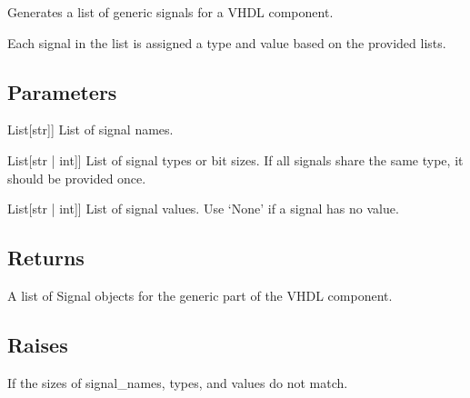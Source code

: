 \documentclass[letterpaper,10pt,english]{sphinxmanual}
\begin{document}

\begin{fulllineitems}
\label{\detokenize{functions:functions.generic_signals_list}}
\pysigstartsignatures
{}
\pysigstopsignatures
\sphinxAtStartPar
Generates a list of generic signals for a VHDL component.

\sphinxAtStartPar
Each signal in the list is assigned a type and value based on the provided lists.


\subsection{Parameters}
\label{\detokenize{functions:id1}}\begin{description}
\sphinxlineitem{signal\_names}{[}List{[}str{]}{]}
\sphinxAtStartPar
List of signal names.

\sphinxlineitem{types}{[}List{[}str | int{]}{]}
\sphinxAtStartPar
List of signal types or bit sizes. If all signals share the same type, it should be provided once.

\sphinxlineitem{values}{[}List{[}str | int{]}{]}
\sphinxAtStartPar
List of signal values. Use ‘None’ if a signal has no value.

\end{description}


\subsection{Returns}
\label{\detokenize{functions:id2}}\begin{description}
\sphinxAtStartPar
A list of Signal objects for the generic part of the VHDL component.

\end{description}


\subsection{Raises}
\label{\detokenize{functions:id3}}\begin{description}
\sphinxAtStartPar
If the sizes of signal\_names, types, and values do not match.

\end{description}

\end{fulllineitems}
\end{document}
